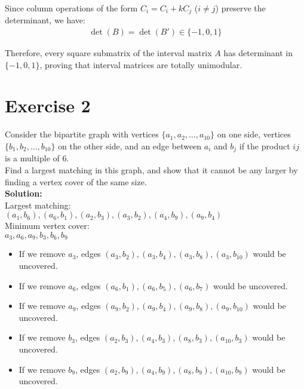 \documentclass{article}
\begin{document}
Since column operations of the form $C_i = C_i + kC_j$ ($i \neq j$) preserve the determinant, we have:
\begin{align*}
\det(B) = \det(B') \in \{-1, 0, 1\}
\end{align*}

Therefore, every square submatrix of the interval matrix $A$ has determinant in $\{-1, 0, 1\}$, proving that interval matrices are totally unimodular.

\newpage

\section*{Exercise 2}
Consider the bipartite graph with vertices $\{a_1, a_2, \ldots, a_{10}\}$ on one side, vertices $\{b_1, b_2, \ldots, b_{10}\}$ on the other side, and an edge between $a_i$ and $b_j$ if the product $ij$ is a multiple of 6. \\

Find a largest matching in this graph, and show that it cannot be any larger by finding a vertex cover of the same size. \\

\textbf{Solution:} \\

Largest matching: \\

$(a_1, b_6), (a_6, b_1), (a_2, b_3), (a_3, b_2), (a_4, b_9), (a_9, b_4)$ \\

Minimum vertex cover: \\

$a_3, a_6, a_9, b_3, b_6, b_9$ \\

\begin{itemize}
    \item If we remove $a_3$, edges $(a_3, b_2), (a_3, b_4), (a_3, b_8), (a_3, b_{10})$ would be uncovered.

    \item If we remove $a_6$, edges $(a_6, b_1), (a_6, b_5), (a_6, b_7)$ would be uncovered.

    \item If we remove $a_9$, edges $(a_9, b_2), (a_9, b_4), (a_9, b_8), (a_9, b_{10})$ would be uncovered.

    \item If we remove $b_3$, edges $(a_2, b_3), (a_4, b_3), (a_8, b_3), (a_{10}, b_3)$ would be uncovered.

    \item If we remove $b_9$, edges $(a_2, b_9), (a_4, b_9), (a_8, b_9), (a_{10}, b_9)$ would be uncovered.
\end{itemize}
\end{document}
